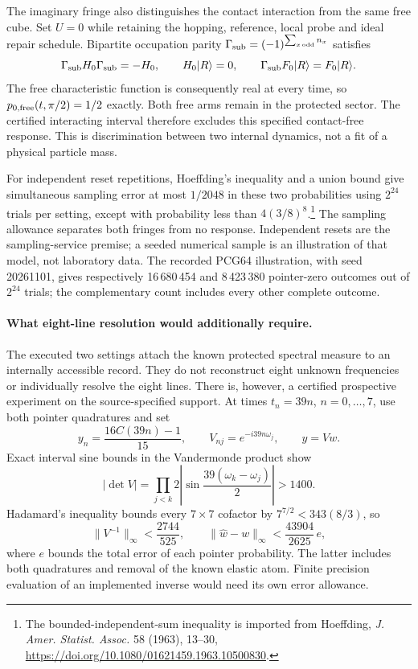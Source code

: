The imaginary fringe also distinguishes the contact interaction from the
same free cube.  Set $U=0$ while retaining the hopping, reference, local
probe and ideal repair schedule.  Bipartite occupation parity
$\Gamma_{\rm sub}=(-1)^{\sum_{x\,\mathrm{odd}}n_x}$ satisfies
\[
 \Gamma_{\rm sub}H_0\Gamma_{\rm sub}=-H_0,\qquad
 H_0|R\rangle=0,\qquad
 \Gamma_{\rm sub}F_0|R\rangle=F_0|R\rangle.
\]
The free characteristic function is consequently real at every time, so
$p_{0,\rm free}(t,\pi/2)=1/2$ exactly.  Both free arms remain in the
protected sector.  The certified interacting interval therefore excludes
this specified contact-free response.  This is discrimination between two
internal dynamics, not a fit of a physical particle mass.

For independent reset repetitions, Hoeffding's inequality and a union bound
give simultaneous sampling error at most $1/2048$ in these two probabilities
using $2^{24}$ trials per setting, except with probability less than
$4(3/8)^8$.\footnote{The bounded-independent-sum inequality is imported from
Hoeffding, \emph{J. Amer. Statist. Assoc.} 58 (1963), 13--30,
\url{https://doi.org/10.1080/01621459.1963.10500830}.}
The sampling allowance separates both fringes from no response.
Independent resets are the sampling-service premise; a seeded numerical
sample is an illustration of that model, not laboratory data.
The recorded PCG64 illustration, with seed 20261101, gives respectively
16\,680\,454 and 8\,423\,380 pointer-zero outcomes out of $2^{24}$ trials;
the complementary count includes every other complete outcome.

\paragraph{What eight-line resolution would additionally require.}
The executed two settings attach the known protected spectral measure to
an internally accessible record.  They do not reconstruct eight unknown
frequencies or individually resolve the eight lines.  There is, however,
a certified prospective experiment on the source-specified support.
At times $t_n=39n$, $n=0,\ldots,7$, use both pointer quadratures and set
\[
 y_n=\frac{16C(39n)-1}{15},\qquad
 V_{nj}=e^{-i39n\omega_j},\qquad y=Vw.
\]
Exact interval sine bounds in the Vandermonde product show
\[
 |\det V|=\prod_{j<k}2\left|\sin\frac{39(\omega_k-\omega_j)}2\right|
 >1400.
\]
Hadamard's inequality bounds every $7\times7$ cofactor by
$7^{7/2}<343(8/3)$, so
\[
 \|V^{-1}\|_\infty<\frac{2744}{525},\qquad
 \|\widehat w-w\|_\infty<\frac{43904}{2625}\,e,
\]
where $e$ bounds the total error of each pointer probability.  The latter
includes both quadratures and removal of the known elastic atom.  Finite
precision evaluation of an implemented inverse would need its own error
allowance.

